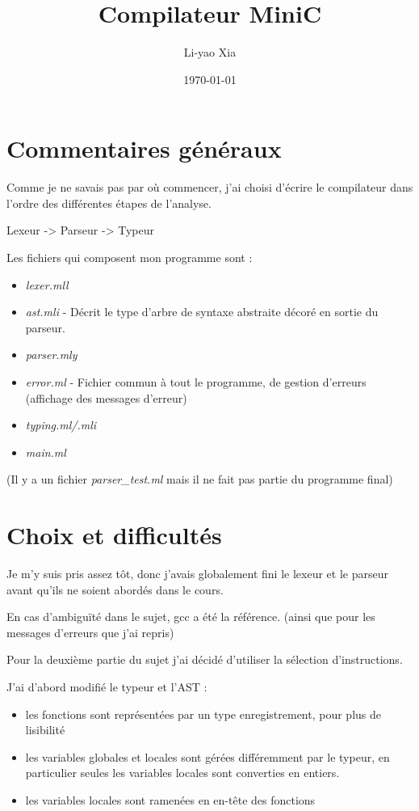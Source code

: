 \documentclass[a4paper]{article}
\begin{document}
\title{Compilateur MiniC}
\author{Li-yao Xia}
\date{\today}

\maketitle

\section{Commentaires généraux}

Comme je ne savais pas par où commencer,
j'ai choisi d'écrire le compilateur dans l'ordre
des différentes étapes de l'analyse. 

Lexeur -> Parseur -> Typeur

Les fichiers qui composent mon programme sont :
\begin{itemize}
  \item {\it lexer.mll}
  \item {\it ast.mli} - Décrit le type d'arbre de syntaxe
  abstraite décoré en sortie du parseur.
  \item {\it parser.mly}
  \item {\it error.ml} - Fichier commun à tout le programme,
  de gestion d'erreurs (affichage des messages d'erreur)
  \item {\it typing.ml/.mli}
  \item {\it main.ml}
\end{itemize}

(Il y a un fichier {\it parser\_test.ml} mais il ne fait pas
partie du programme final)

\section{Choix et difficultés}

Je m'y suis pris assez tôt, donc j'avais globalement fini le
lexeur et le parseur avant qu'ils ne soient abordés dans le cours.

En cas d'ambiguïté dans le sujet, gcc a été la référence. (ainsi que pour
les messages d'erreurs que j'ai repris)

Pour la deuxième partie du sujet j'ai décidé d'utiliser la sélection
d'instructions.

J'ai d'abord modifié le typeur et l'AST :
\begin{itemize}
  \item les fonctions sont représentées par un type enregistrement,
  pour plus de lisibilité
  \item les variables globales et locales sont gérées différemment par le
  typeur, en particulier seules les variables locales sont converties en
  entiers.
  \item les variables locales sont ramenées en en-tête des fonctions
\end{itemize}
\end{document}
